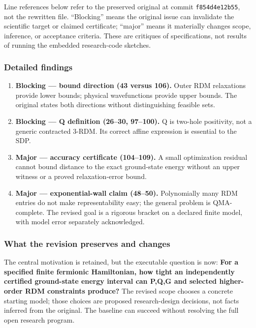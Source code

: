 \documentclass[
  11pt,
]{article}
\begin{document}
Line references below refer to the preserved original at commit
\texttt{f854d4e12b55}, not the rewritten file. ``Blocking'' means the
original issue can invalidate the scientific target or claimed
certificate; ``major'' means it materially changes scope, inference, or
acceptance criteria. These are critiques of specifications, not results
of running the embedded research-code sketches.

\subsubsection{Detailed findings}

\begin{enumerate}
\def\labelenumi{\arabic{enumi}.}
\item
  \textbf{Blocking --- bound direction (43 versus 106).} Outer RDM
  relaxations provide lower bounds; physical wavefunctions provide upper
  bounds. The original states both directions without distinguishing
  feasible sets.
\item
  \textbf{Blocking --- Q definition (26--30, 97--100).} Q is two-hole
  positivity, not a generic contracted 3-RDM. Its correct affine
  expression is essential to the SDP.
\item
  \textbf{Major --- accuracy certificate (104--109).} A small
  optimization residual cannot bound distance to the exact ground-state
  energy without an upper witness or a proved relaxation-error bound.
\item
  \textbf{Major --- exponential-wall claim (48--50).} Polynomially many
  RDM entries do not make representability easy; the general problem is
  QMA-complete. The revised goal is a rigorous bracket on a declared
  finite model, with model error separately acknowledged.
\end{enumerate}

\subsubsection{What the revision preserves and changes}

The central motivation is retained, but the executable question is now:
\textbf{For a specified finite fermionic Hamiltonian, how tight an
independently certified ground-state energy interval can P,Q,G and
selected higher-order RDM constraints produce?} The revised scope
chooses a concrete starting model; those choices are proposed
research-design decisions, not facts inferred from the original. The
baseline can succeed without resolving the full open research program.
\end{document}
